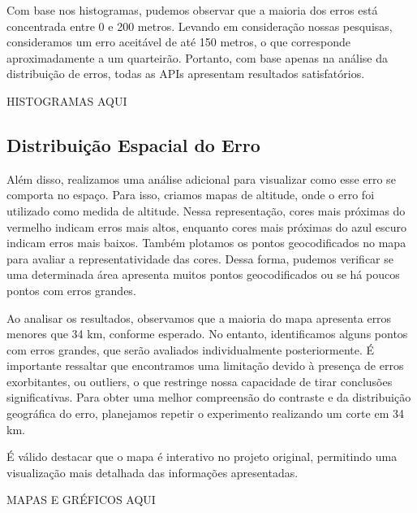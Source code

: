 \documentclass{article}
\begin{document}
Com base nos histogramas, pudemos observar que a maioria dos erros está concentrada entre 0 e 200 metros. Levando em consideração nossas pesquisas, consideramos um erro aceitável de até 150 metros, o que corresponde aproximadamente a um quarteirão. Portanto, com base apenas na análise da distribuição de erros, todas as APIs apresentam resultados satisfatórios.

HISTOGRAMAS AQUI

\subsection{Distribuição Espacial do Erro}
Além disso, realizamos uma análise adicional para visualizar como esse erro se comporta no espaço. Para isso, criamos mapas de altitude, onde o erro foi utilizado como medida de altitude. Nessa representação, cores mais próximas do vermelho indicam erros mais altos, enquanto cores mais próximas do azul escuro indicam erros mais baixos. Também plotamos os pontos geocodificados no mapa para avaliar a representatividade das cores. Dessa forma, pudemos verificar se uma determinada área apresenta muitos pontos geocodificados ou se há poucos pontos com erros grandes.

Ao analisar os resultados, observamos que a maioria do mapa apresenta erros menores que 34 km, conforme esperado. No entanto, identificamos alguns pontos com erros grandes, que serão avaliados individualmente posteriormente. É importante ressaltar que encontramos uma limitação devido à presença de erros exorbitantes, ou outliers, o que restringe nossa capacidade de tirar conclusões significativas. Para obter uma melhor compreensão do contraste e da distribuição geográfica do erro, planejamos repetir o experimento realizando um corte em 34 km.

É válido destacar que o mapa é interativo no projeto original, permitindo uma visualização mais detalhada das informações apresentadas.

MAPAS E GRÉFICOS AQUI
   
 



\end{document}

